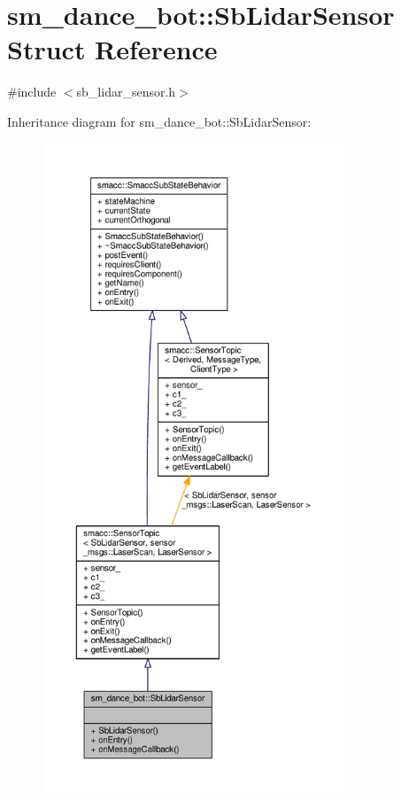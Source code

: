 \hypertarget{structsm__dance__bot_1_1SbLidarSensor}{}\section{sm\+\_\+dance\+\_\+bot\+:\+:Sb\+Lidar\+Sensor Struct Reference}
\label{structsm__dance__bot_1_1SbLidarSensor}


{\ttfamily \#include $<$sb\+\_\+lidar\+\_\+sensor.\+h$>$}



Inheritance diagram for sm\+\_\+dance\+\_\+bot\+:\+:Sb\+Lidar\+Sensor\+:
\nopagebreak
\begin{figure}[H]
\begin{center}
\leavevmode
\includegraphics[height=550pt]{structsm__dance__bot_1_1SbLidarSensor__inherit__graph}
\end{center}
\end{figure}


